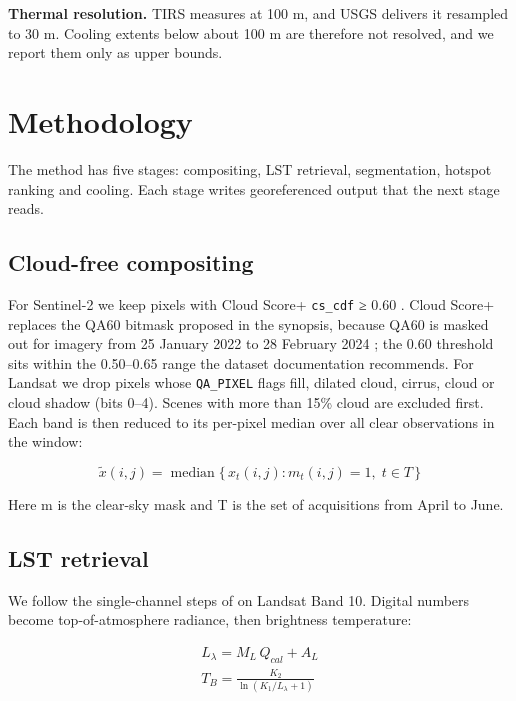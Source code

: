 \documentclass[conference]{IEEEtran}
\begin{document}
\textbf{Thermal resolution.} TIRS measures at 100 m, and USGS delivers
it resampled to 30 m. Cooling extents below about 100 m are therefore
not resolved, and we report them only as upper bounds.

\section{Methodology}\label{methodology}

The method has five stages: compositing, LST retrieval, segmentation,
hotspot ranking and cooling. Each stage writes georeferenced output that
the next stage reads.

\subsection{Cloud-free compositing}\label{cloud-free-compositing}

For Sentinel-2 we keep pixels with Cloud Score+ \texttt{cs\_cdf} ≥ 0.60
\cite{b13}. Cloud Score+ replaces the QA60 bitmask proposed in the
synopsis, because QA60 is masked out for imagery from 25 January 2022 to
28 February 2024 \cite{b21}; the 0.60 threshold sits within the
0.50--0.65 range the dataset documentation recommends. For Landsat we
drop pixels whose \texttt{QA\_PIXEL} flags fill, dilated cloud, cirrus,
cloud or cloud shadow (bits 0--4). Scenes with more than 15\% cloud are
excluded first. Each band is then reduced to its per-pixel median over
all clear observations in the window:

\begin{equation}
\tilde{x}(i,j) = \operatorname{median}\{\, x_t(i,j) : m_t(i,j) = 1,\; t \in T \,\}
\end{equation}

Here m is the clear-sky mask and T is the set of acquisitions from April
to June.

\subsection{LST retrieval}\label{lst-retrieval}

We follow the single-channel steps of \cite{b1} on Landsat Band 10.
Digital numbers become top-of-atmosphere radiance, then brightness
temperature:

\begin{equation}
\begin{gathered}
L_\lambda = M_L \, Q_{cal} + A_L \\
T_B = \frac{K_2}{\ln\!\left( K_1 / L_\lambda + 1 \right)}
\end{gathered}
\end{equation}
\end{document}
